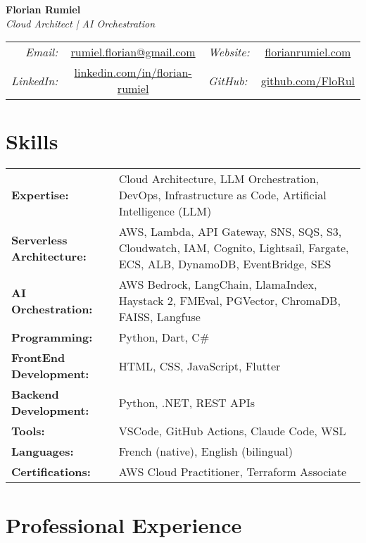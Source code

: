 ﻿\documentclass[11pt,letterpaper]{article}
\begin{document}
\begin{center}
  {\LARGE\textbf{Florian Rumiel}} \\[0.3em]
  {\large\textit{Cloud Architect | AI Orchestration}} \\[0.5em]
  \begin{tabular}{r c l c}
    \textit{Email:} & \href{mailto:rumiel.florian@gmail.com}{rumiel.florian@gmail.com} & \textit{Website:} & \href{https://florian-rumiel.com}{florianrumiel.com} \\
    \textit{LinkedIn:} & \href{https://linkedin.com/in/florian-rumiel}{linkedin.com/in/florian-rumiel} & \textit{GitHub:} & \href{https://github.com/FloRul}{github.com/FloRul} \\
  \end{tabular}
\end{center}

\section*{Skills}
\begin{tabularx}{\textwidth}{@{}l X@{}}
\textbf{Expertise:} & Cloud Architecture, LLM Orchestration, DevOps, Infrastructure as Code, Artificial Intelligence (LLM) \\[0.2em]
\textbf{Serverless Architecture:} & AWS, Lambda, API Gateway, SNS, SQS, S3, Cloudwatch, IAM, Cognito, Lightsail, Fargate, ECS, ALB, DynamoDB, EventBridge, SES \\[0.2em]
\textbf{AI Orchestration:} & AWS Bedrock, LangChain, LlamaIndex, Haystack 2, FMEval, PGVector, ChromaDB, FAISS, Langfuse \\[0.2em]
\textbf{Programming:} & Python, Dart, C\# \\[0.2em]
\textbf{FrontEnd Development:} & HTML, CSS, JavaScript, Flutter \\[0.2em]
\textbf{Backend Development:} & Python, .NET, REST APIs \\[0.2em]
\textbf{Tools:} & VSCode, GitHub Actions, Claude Code, WSL \\[0.2em]
\textbf{Languages:} & French (native), English (bilingual) \\
\textbf{Certifications:} & AWS Cloud Practitioner, Terraform Associate \\
\end{tabularx}

\section*{Professional Experience}
\end{document}
